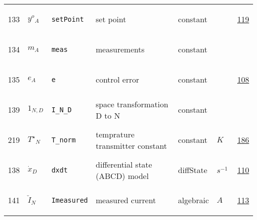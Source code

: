 \begin{longtable}{|p{1cm}|p{2.5cm}|p{4.5cm}|p{8cm}|p{3.0cm}|p{3cm}|p{1cm}|}
            133
             & \hypertarget{"v:133"}{ $ {{y^o}}{_{A}} $}
             & \verb|setPoint|
             & set point
             & \begin{lay}constant \end{lay}
             & $  $
             &                 \hyperlink{"e:119"}{ 119 }
                 \\
            134
             & \hypertarget{"v:134"}{ $ {m}{_{A}} $}
             & \verb|meas|
             & measurements
             & \begin{lay}constant \end{lay}
             & $  $
             & \\
            135
             & \hypertarget{"v:135"}{ $ {e}{_{A}} $}
             & \verb|e|
             & control error
             & \begin{lay}constant \end{lay}
             & $  $
             &                 \hyperlink{"e:108"}{ 108 }
                 \\
            139
             & \hypertarget{"v:139"}{ $ {1}{_{N, D}} $}
             & \verb|I_N_D|
             & space transformation D to N
             & \begin{lay}constant \end{lay}
             & $  $
             & \\
            219
             & \hypertarget{"v:219"}{ $ {{T^{\star}}}{_{N}} $}
             & \verb|T_norm|
             & temprature transmitter constant
             & \begin{lay}constant \end{lay}
             & $ K \, $
             &                 \hyperlink{"e:186"}{ 186 }
                 \\
            138
             & \hypertarget{"v:138"}{ $ {{\dot{x}}}{_{D}} $}
             & \verb|dxdt|
             & differential state (ABCD) model
             & \begin{lay}diffState \end{lay}
             & $ s^{-1} \, $
             &                 \hyperlink{"e:110"}{ 110 }
                 \\
            141
             & \hypertarget{"v:141"}{ $ {{\check{I}}}{_{N}} $}
             & \verb|Imeasured|
             & measured current
             & \begin{lay}algebraic \end{lay}
             & $ A \, $
             &                 \hyperlink{"e:113"}{ 113 }

\end{longtable}
